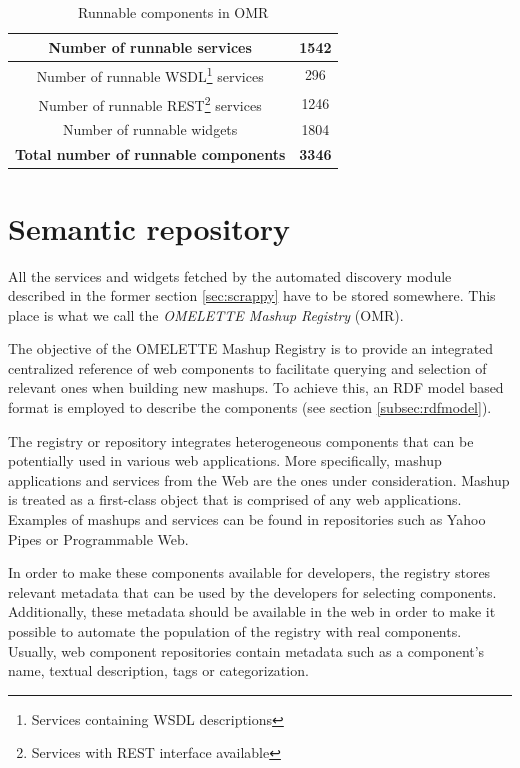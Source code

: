 \begin {table}[ht!]
\caption {Runnable components in OMR} \label{tab:omrcomrun} 
\begin{center}
	\begin{tabular}{|c|c|}
		\hline Number of runnable services                  & 1542          \\ 
		\hline Number of runnable WSDL\footnote{Services containing WSDL descriptions} services             & 296           \\ 
		\hline Number of runnable REST\footnote{Services with REST interface available} services             & 1246          \\ 
		\hline Number of runnable widgets                   & 1804          \\ 
		\hline \textbf{Total number of runnable components} & \textbf{3346} \\ 
		\hline 
	\end{tabular} 
\end{center}
\end{table}

\section{Semantic repository}
\label{sec:omrsesame}
All the services and widgets fetched by the automated discovery module described in the former section \ref{sec:scrappy} have to be stored somewhere. This place is what we call the \textit{OMELETTE Mashup Registry} (OMR).

The objective of the OMELETTE Mashup Registry is to provide an integrated centralized reference of web components to facilitate querying and selection of relevant ones when building new mashups. To achieve this, an RDF model based format is employed to describe the components (see section \ref{subsec:rdfmodel}). 

The registry or repository integrates heterogeneous components that can be potentially used in various web applications. More specifically, mashup applications and services from the Web are the ones under consideration. Mashup is treated as a first-class object that is comprised of any web applications. Examples of mashups and services can be found in repositories such as Yahoo Pipes or Programmable Web.

In order to make these components available for developers, the registry stores relevant metadata that can be used by the developers for selecting components. Additionally, these metadata should be available in the web in order to make it possible to automate the population of the registry with real components. Usually, web component repositories contain metadata such as a component's name, textual description, tags or categorization.

